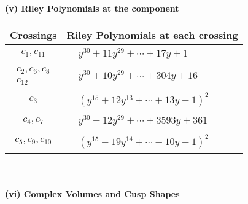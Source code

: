 \documentclass[1p]{elsarticle_modified}
\theoremstyle{definition}
\begin{document}
\flushleft \textbf{(v) Riley Polynomials at the component}\newline \\
\begin{tabular}{m{50pt}|m{274pt}}
Crossings & \hspace{64pt}Riley Polynomials at each crossing \\
\hline $$\begin{aligned}c_{1},c_{11}\end{aligned}$$&$\begin{aligned}
&y^{30}+11 y^{29}+\cdots+17 y+1
\end{aligned}$\\
\hline $$\begin{aligned}c_{2},c_{6},c_{8}\\c_{12}\end{aligned}$$&$\begin{aligned}
&y^{30}+10 y^{29}+\cdots+304 y+16
\end{aligned}$\\
\hline $$\begin{aligned}c_{3}\end{aligned}$$&$\begin{aligned}
&(y^{15}+12 y^{13}+\cdots+13 y-1)^{2}
\end{aligned}$\\
\hline $$\begin{aligned}c_{4},c_{7}\end{aligned}$$&$\begin{aligned}
&y^{30}-12 y^{29}+\cdots+3593 y+361
\end{aligned}$\\
\hline $$\begin{aligned}c_{5},c_{9},c_{10}\end{aligned}$$&$\begin{aligned}
&(y^{15}-19 y^{14}+\cdots-10 y-1)^{2}
\end{aligned}$\\
\hline
\end{tabular}\\~\\
\newpage\flushleft \textbf{(vi) Complex Volumes and Cusp Shapes}
\end{document}
